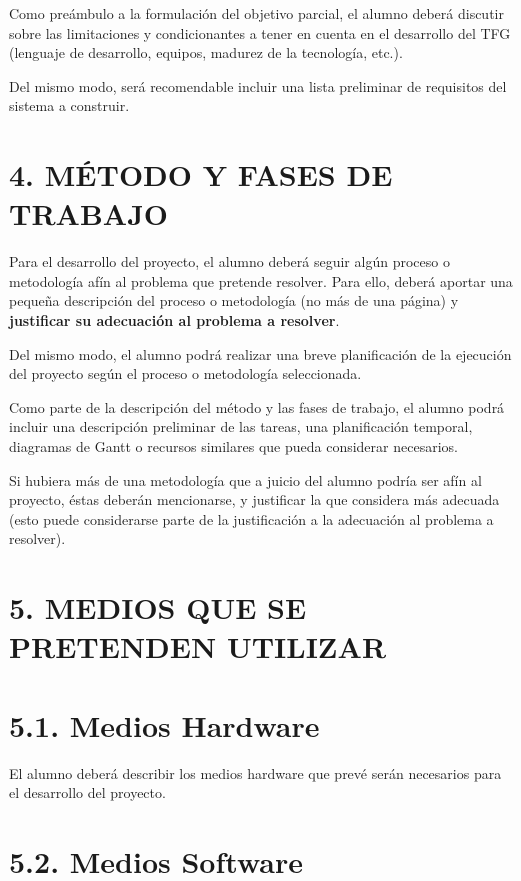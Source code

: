 \documentclass[a4paper]{article}
\begin{document}
Como pre\'ambulo a la formulaci\'on del objetivo parcial, el alumno deber\'a discutir sobre las limitaciones y
condicionantes a tener en cuenta en el desarrollo del TFG (lenguaje de desarrollo, equipos, madurez de la tecnolog\'ia,
etc.).

Del mismo modo, ser\'a recomendable incluir una lista preliminar de requisitos del sistema a construir.

\section[4. M\'ETODO Y FASES DE TRABAJO]{4. M\'ETODO Y FASES DE TRABAJO}

\bigskip

Para el desarrollo del proyecto, el alumno deber\'a seguir alg\'un proceso o metodolog\'ia af\'in al problema que
pretende resolver. Para ello, deber\'a aportar una peque\~na descripci\'on del proceso o metodolog\'ia (no m\'as de una
p\'agina) y \textbf{justificar su adecuaci\'on al problema a resolver}.

Del mismo modo, el alumno podrá realizar una breve planificaci\'on de la ejecuci\'on del proyecto seg\'un el proceso
o metodolog\'ia seleccionada.

Como parte de la descripci\'on del m\'etodo y las fases de trabajo, el alumno podr\'a incluir una descripci\'on
preliminar de las tareas, una planificaci\'on temporal, diagramas de Gantt o recursos similares que pueda considerar
necesarios.

Si hubiera m\'as de una metodolog\'ia que a juicio del alumno podr\'ia ser af\'in al proyecto, \'estas deber\'an
mencionarse, y justificar la que considera m\'as adecuada (esto puede considerarse parte de la justificaci\'on a la
adecuaci\'on al problema a resolver).

\section{5. MEDIOS QUE SE PRETENDEN UTILIZAR}
\section{5.1. Medios Hardware}

El alumno deber\'a describir los medios hardware que prev\'e ser\'an necesarios para el desarrollo del proyecto.

\section{5.2. Medios Software}
\end{document}
